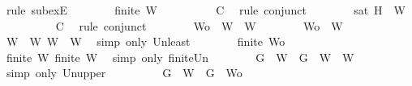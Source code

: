 \begin{isabellebody}
\ {\isacharparenleft}rule\ subexE{\isacharparenright}\isanewline
\ \ \ \ \ \ \isamarkupfalse%
\ {\isachardoublequoteopen}finite\ W{}{\isachardoublequoteclose}\isanewline
\ \ \ \ \ \ \ \ \isamarkupfalse%
\ C{}\ \isamarkupfalse%
\ {\isacharparenleft}rule\ conjunct{}{\isacharparenright}\isanewline
\ \ \ \ \ \ \isamarkupfalse%
\ {\isachardoublequoteopen}{\isasymnot}{\isacharparenleft}sat\ {\isacharparenleft}{\isacharbraceleft}H{\isacharbraceright}\ {\isasymunion}\ W{}{\isacharparenright}{\isacharparenright}{\isachardoublequoteclose}\isanewline
\ \ \ \ \ \ \ \ \isamarkupfalse%
\ C{}\ \isamarkupfalse%
\ {\isacharparenleft}rule\ conjunct{}{\isacharparenright}\isanewline
\ \ \ \ \ \ \isamarkupfalse%
\ {\isacharquery}Wo\ {\isacharequal}\ {\isachardoublequoteopen}W{}\ {\isasymunion}\ W{}{\isachardoublequoteclose}\isanewline
\ \ \ \ \ \ \isamarkupfalse%
\ {\isachardoublequoteopen}{\isacharquery}Wo\ {\isasymsubseteq}\ W{\isachardoublequoteclose}\isanewline
\ \ \ \ \ \ \ \ \isamarkupfalse%
\ {\isacartoucheopen}W{}\ {\isasymsubseteq}\ W{\isacartoucheclose}\ {\isacartoucheopen}W{}\ {\isasymsubseteq}\ W{\isacartoucheclose}\ \isamarkupfalse%
\ {\isacharparenleft}simp\ only{\isacharcolon}\ Un{\isacharunderscore}least{\isacharparenright}\isanewline
\ \ \ \ \ \ \isamarkupfalse%
\ {\isachardoublequoteopen}finite\ {\isacharquery}Wo{\isachardoublequoteclose}\isanewline
\ \ \ \ \ \ \ \ \isamarkupfalse%
\ {\isacartoucheopen}finite\ W{}{\isacartoucheclose}\ {\isacartoucheopen}finite\ W{}{\isacartoucheclose}\ \isamarkupfalse%
\ {\isacharparenleft}simp\ only{\isacharcolon}\ finite{\isacharunderscore}Un{\isacharparenright}\isanewline
\ \ \ \ \ \ \isamarkupfalse%
\ {\isachardoublequoteopen}{\isacharbraceleft}G{\isacharbraceright}\ {\isasymunion}\ W{}\ {\isasymsubseteq}\ {\isacharparenleft}{\isacharbraceleft}G{\isacharbraceright}\ {\isasymunion}\ W{}{\isacharparenright}\ {\isasymunion}\ W{}{\isachardoublequoteclose}\isanewline
\ \ \ \ \ \ \ \ \isamarkupfalse%
\ {\isacharparenleft}simp\ only{\isacharcolon}\ Un{\isacharunderscore}upper{}{\isacharparenright}\isanewline
\ \ \ \ \ \ \isamarkupfalse%
\ \isamarkupfalse%
\ {\isachardoublequoteopen}{\isacharbraceleft}G{\isacharbraceright}\ {\isasymunion}\ W{}\ {\isasymsubseteq}\ {\isacharbraceleft}G{\isacharbraceright}\ {\isasymunion}\ {\isacharquery}Wo{\isachardoublequoteclose}\isanewline

\end{isabellebody}
